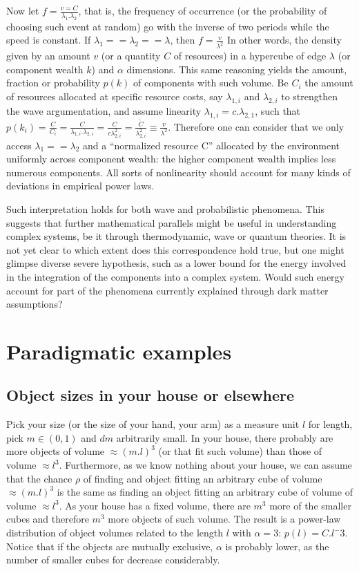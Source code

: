 \documentclass[a4paper, 11pt]{article} %
\begin{document}
Now let $f=\frac{v=C}{\lambda_1 . \lambda_2}$, that is,
the frequency of occurrence
(or the probability of choosing such event at random) go with the inverse of two periods while the speed is constant. 
If $\lambda_1==\lambda_2==\lambda$, then $f=\frac{v}{\lambda^2}$
In other words, the density given by an amount $v$
(or a quantity $C$ of resources) in a hypercube of
edge $\lambda$ (or component wealth $k$)
and $\alpha$ dimensions.
This same reasoning yields the amount, fraction or probability $p(k)$
of components with such volume.
Be $C_i$ the amount of resources allocated at
specific resource costs,
say $\lambda_{1,i}$ and $\lambda_{2,i}$ to strengthen the wave argumentation,
and assume linearity $\lambda_{1,i}=c.\lambda_{2,1}$,
such that
$p(k_i)=\frac{C}{C_i}=\frac{C}{\lambda_{1,i}.\lambda_{2,i}}=
\frac{C}{c\lambda_{2,i}^2}=\frac{\widetilde{C}}{\lambda_{2,i}^2}\equiv\frac{v}{\lambda^2}$.
Therefore one can consider that we only access $\lambda_1==\lambda_2$ and a ``normalized resource C'' allocated by the environment uniformly across component wealth: the higher component wealth implies less numerous components. 
All sorts of nonlinearity should account
for many kinds of deviations in empirical power laws.

Such interpretation holds for 
both wave and probabilistic phenomena.
This suggests that further mathematical
parallels might be useful in understanding complex
systems, be it through thermodynamic, wave or quantum theories.
It is not yet clear to which extent does this correspondence hold true,
but one might glimpse diverse severe hypothesis,
such as a lower bound for the energy involved in the integration of
the components into a complex system.
Would such energy account for part of the phenomena
currently explained through dark matter assumptions?

\section{Paradigmatic examples}
\subsection{Object sizes in your house or elsewhere}
Pick your size (or the size of your hand, your arm)
as a measure unit $l$ for length, pick $m \in (0,1)$ 
and $dm$ arbitrarily small.
In your house, there probably are more objects
of volume $\approx (m.l)^3$ (or that fit such volume)
than those of volume $\approx l^3$.
Furthermore, as we know nothing about your house,
we can assume that the chance $\rho$ of finding and object
fitting an arbitrary cube of volume $\approx (m.l)^3$
is the same as finding an object fitting an
arbitrary cube of volume of volume $\approx l^3$.
As your house has a fixed volume, there are $m^3$ more of
the smaller cubes and therefore $m^3$ more objects of such
volume. 
The result is a power-law distribution of object volumes
related to the length $l$ with $\alpha=3$:
$p(l)=C.l^-3$.
Notice that if the objects are mutually exclusive,
$\alpha$ is probably lower, as the number of smaller
cubes for decrease considerably.
\end{document}
